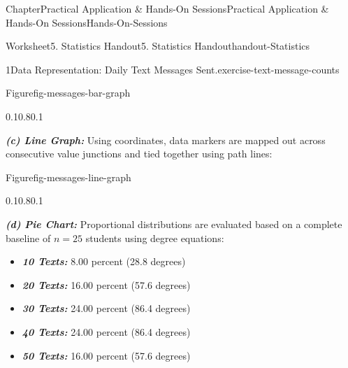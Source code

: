 \documentclass[oneside,10pt,]{book}
\newcommand{\ptxlistdisc}{\raisebox{0.3ex}{\textbullet}}
\newcommand{\alert}[1]{\textbf{\textit{#1}}}
\begin{document}
\begin{chapterptx}{Chapter}{Practical Application \& Hands-On Sessions}{}{Practical Application \& Hands-On Sessions}{}{}{Hands-On-Sessions}
\begin{worksheet-section}{Worksheet}{5. Statistics Handout}{}{5. Statistics Handout}{}{}{handout-Statistics}
\begin{divisionexercise}{1}{Data Representation: Daily Text Messages Sent.}{}{exercise-text-message-counts}
\begin{figureptx}{Figure}{}{fig-messages-bar-graph}{}
\begin{image}{0.1}{0.8}{0.1}{}
%
\end{image}%
\tcblower
\end{figureptx}%
\alert{(c) Line Graph:} Using coordinates, data markers are mapped out across consecutive value junctions and tied together using path lines:%
\begin{figureptx}{Figure}{}{fig-messages-line-graph}{}%
\begin{image}{0.1}{0.8}{0.1}{}%
%
\end{image}%
\tcblower
\end{figureptx}%
\alert{(d) Pie Chart:} Proportional distributions are evaluated based on a complete baseline of \(n = 25\) students using degree equations:%
\par
%
\begin{itemize}[label=\ptxlistdisc]
\item{}\alert{10 Texts:} 8.00 percent (28.8 degrees)%
\item{}\alert{20 Texts:} 16.00 percent (57.6 degrees)%
\item{}\alert{30 Texts:} 24.00 percent (86.4 degrees)%
\item{}\alert{40 Texts:} 24.00 percent (86.4 degrees)%
\item{}\alert{50 Texts:} 16.00 percent (57.6 degrees)%

\end{itemize}
\end{divisionexercise}
\end{worksheet-section}
\end{chapterptx}
\end{document}
